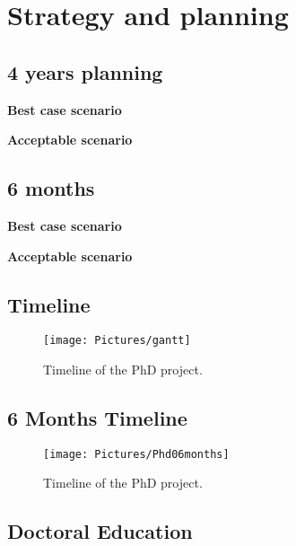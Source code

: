\documentclass[]{scrreprt}
\begin{document}
\chapter{Strategy and planning}

\section{4 years planning}

\textbf{Best case scenario}


\textbf{Acceptable scenario}

\section{6 months}

\textbf{Best case scenario}


\textbf{Acceptable scenario}

\newpage
\section{Timeline}
\begin{figure}[h!]
\centering
\texttt{[image: Pictures/gantt]}
\caption{Timeline of the PhD project.}
\label{fig:gantt}
\end{figure}
\newpage
\section{6 Months Timeline}
\begin{figure}[h!]
	\centering
	\texttt{[image: Pictures/Phd06months]}
	\caption{Timeline of the PhD project.}
	\label{fig:Phd06months}
\end{figure}
\newpage
\section{Doctoral Education}
\end{document}
